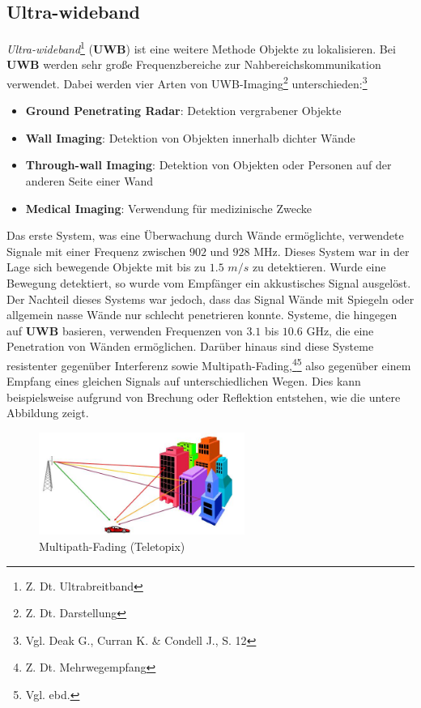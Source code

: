 \subsection{Ultra-wideband}

\textit{Ultra-wideband}\footnote{Z. Dt. Ultrabreitband} (\textbf{UWB}) ist eine weitere Methode Objekte zu lokalisieren. Bei \textbf{UWB} werden sehr große Frequenzbereiche zur Nahbereichskommunikation verwendet. Dabei werden vier Arten von UWB-Imaging\footnote{Z. Dt. Darstellung} unterschieden:\footnote{Vgl. Deak G.,  Curran K. \& Condell J., S. 12}
\begin{itemize}
 	\item \textbf{Ground Penetrating Radar}: Detektion vergrabener Objekte 
 	\item \textbf{Wall Imaging}: Detektion von Objekten innerhalb dichter Wände
 	\item \textbf{Through-wall Imaging}: Detektion von Objekten oder Personen auf der anderen Seite einer Wand
 	\item \textbf{Medical Imaging}: Verwendung für medizinische Zwecke
 \end{itemize} 

Das erste System, was eine Überwachung durch Wände ermöglichte, verwendete Signale mit einer Frequenz zwischen $902$ und $928$ MHz. Dieses System war in der Lage sich bewegende Objekte mit bis zu $1.5$ $m/s$ zu detektieren. Wurde eine Bewegung detektiert, so wurde vom Empfänger ein akkustisches Signal ausgelöst. Der Nachteil dieses Systems war jedoch, dass das Signal Wände mit Spiegeln oder allgemein nasse Wände nur schlecht penetrieren konnte. Systeme, die hingegen auf \textbf{UWB} basieren, verwenden Frequenzen von $3.1$ bis $10.6$ GHz, die eine Penetration von Wänden ermöglichen. Darüber hinaus sind diese Systeme resistenter gegenüber Interferenz sowie Multipath-Fading,\footnote{Z. Dt. Mehrwegempfang}\footnote{Vgl. ebd.} also gegenüber einem Empfang eines gleichen Signals auf unterschiedlichen Wegen. Dies kann beispielsweise aufgrund von Brechung oder Reflektion entstehen, wie die untere Abbildung zeigt.\\

\begin{figure}[H]
	\centering
	\includegraphics[width=0.6\textwidth]{pictures/multi}
	\caption{Multipath-Fading (Teletopix)}
\end{figure}

